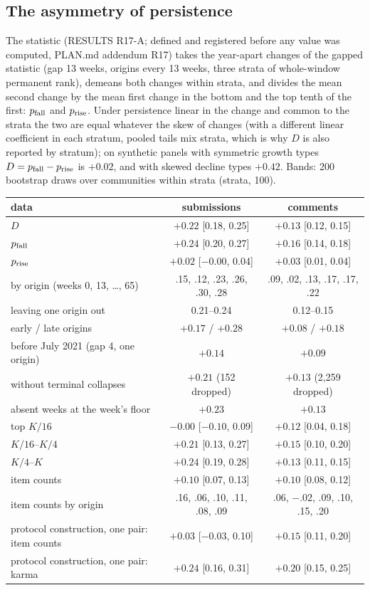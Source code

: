 \documentclass[10pt]{article}
\begin{document}
\subsection{The asymmetry of persistence}\label{sec:asym}
The statistic (RESULTS R17-A; defined and registered before any value was computed, PLAN.md addendum R17) takes the year-apart changes of the gapped statistic (gap 13 weeks, origins every 13 weeks, three strata of whole-window permanent rank), demeans both changes within strata, and divides the mean second change by the mean first change in the bottom and the top tenth of the first: $p_{\rm fall}$ and $p_{\rm rise}$. Under persistence linear in the change and common to the strata the two are equal whatever the skew of changes (with a different linear coefficient in each stratum, pooled tails mix strata, which is why $D$ is also reported by stratum); on synthetic panels with symmetric growth types $D = p_{\rm fall} - p_{\rm rise}$ is $+0.02$, and with skewed decline types $+0.42$. Bands: 200 bootstrap draws over communities within strata (strata, 100).
\begin{center}\small\begin{tabular}{lcc}
\toprule
data & submissions & comments\\
\midrule
$D$ & $+0.22$ [0.18, 0.25] & $+0.13$ [0.12, 0.15]\\
$p_{\rm fall}$ & $+0.24$ [0.20, 0.27] & $+0.16$ [0.14, 0.18]\\
$p_{\rm rise}$ & $+0.02$ [$-0.00$, 0.04] & $+0.03$ [0.01, 0.04]\\
by origin (weeks 0, 13, \ldots, 65) & .15, .12, .23, .26, .30, .28 & .09, .02, .13, .17, .17, .22\\
leaving one origin out & 0.21--0.24 & 0.12--0.15\\
early / late origins & $+0.17$ / $+0.28$ & $+0.08$ / $+0.18$\\
before July 2021 (gap 4, one origin) & $+0.14$ & $+0.09$\\
without terminal collapses & $+0.21$ (152 dropped) & $+0.13$ (2,259 dropped)\\
absent weeks at the week's floor & $+0.23$ & $+0.13$\\
top $K/16$ & $-0.00$ [$-0.10$, 0.09] & $+0.12$ [0.04, 0.18]\\
$K/16$--$K/4$ & $+0.21$ [0.13, 0.27] & $+0.15$ [0.10, 0.20]\\
$K/4$--$K$ & $+0.24$ [0.19, 0.28] & $+0.13$ [0.11, 0.15]\\
item counts & $+0.10$ [0.07, 0.13] & $+0.10$ [0.08, 0.12]\\
item counts by origin & .16, .06, .10, .11, .08, .09 & .06, $-$.02, .09, .10, .15, .20\\
protocol construction, one pair: item counts & $+0.03$ [$-0.03$, 0.10] & $+0.15$ [0.11, 0.20]\\
protocol construction, one pair: karma & $+0.24$ [0.16, 0.31] & $+0.20$ [0.15, 0.25]\\
\bottomrule
\end{tabular}\end{center}
\end{document}
